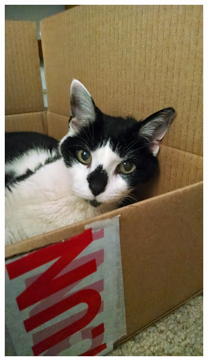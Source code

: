 \documentclass{beamer}
\begin{document}
\begin{frame}
\begin{columns}
\begin{column}{0.5\textwidth}
\begin{center}
        \includegraphics[height = 0.555\textheight, keepaspectratio = true]{figure/monty}
      \end{center}
    \end{column}
  \end{columns}
\end{frame}
\end{document}
